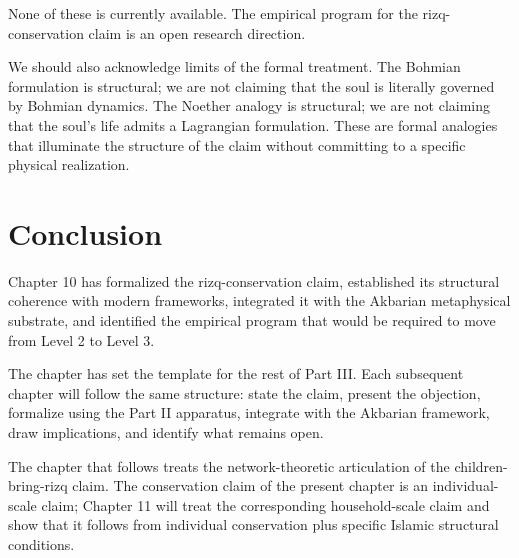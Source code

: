 None of these is currently available. The empirical program for
the rizq-conservation claim is an open research direction.

We should also acknowledge limits of the formal treatment. The
Bohmian formulation is structural; we are not claiming that the
soul is literally governed by Bohmian dynamics. The Noether
analogy is structural; we are not claiming that the soul's life
admits a Lagrangian formulation. These are formal analogies that
illuminate the structure of the claim without committing to a
specific physical realization.

\section{Conclusion}

Chapter 10 has formalized the rizq-conservation claim, established
its structural coherence with modern frameworks, integrated it with
the Akbarian metaphysical substrate, and identified the empirical
program that would be required to move from Level 2 to Level 3.

The chapter has set the template for the rest of Part III. Each
subsequent chapter will follow the same structure: state the claim,
present the objection, formalize using the Part II apparatus,
integrate with the Akbarian framework, draw implications, and
identify what remains open.

The chapter that follows treats the network-theoretic articulation
of the children-bring-rizq claim. The conservation claim of the
present chapter is an individual-scale claim; Chapter 11 will treat
the corresponding household-scale claim and show that it follows
from individual conservation plus specific Islamic structural
conditions.

